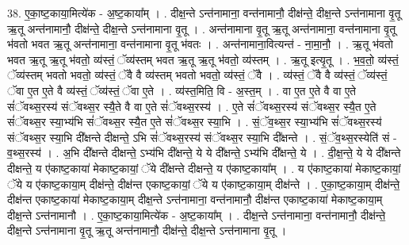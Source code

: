 \documentclass[17pt]{extarticle}
\begin{document}
38. ए॒का॒ष्ट॒काया॒मित्ये॑क - अ॒ष्ट॒काया᳚म् । . दीक्ष॒न्ते ऽन्त॑नामाना॒ वन्त॑नामानौ॒ दीक्ष॑न्ते॒ दीक्ष॒न्ते ऽन्त॑नामाना वृ॒तू ऋ॒तू अन्त॑नामानौ॒ दीक्ष॑न्ते॒ दीक्ष॒न्ते ऽन्त॑नामाना वृ॒तू । . अन्त॑नामाना वृ॒तू ऋ॒तू अन्त॑नामाना॒ वन्त॑नामाना वृ॒तू भ॑वतो भवत ऋ॒तू अन्त॑नामाना॒ वन्त॑नामाना वृ॒तू भ॑वतः । . अन्त॑नामाना॒वित्यन्त॑ - ना॒मा॒नौ॒ । . ऋ॒तू भ॑वतो भवत ऋ॒तू ऋ॒तू भ॑वतो॒ व्य॑स्तं॒ ॅव्य॑स्तम् भवत ऋ॒तू ऋ॒तू भ॑वतो॒ व्य॑स्तम् । . ऋ॒तू इत्यृ॒तू । . भ॒व॒तो॒ व्य॑स्तं॒ ॅव्य॑स्तम् भवतो भवतो॒ व्य॑स्तं॒ ॅवै वै व्य॑स्तम् भवतो भवतो॒ व्य॑स्तं॒ ॅवै । . व्य॑स्तं॒ ॅवै वै व्य॑स्तं॒ ॅव्य॑स्तं॒ ॅवा ए॒त ए॒ते वै व्य॑स्तं॒ ॅव्य॑स्तं॒ ॅवा ए॒ते । . व्य॑स्त॒मिति॒ वि - अ॒स्त॒म् । . वा ए॒त ए॒ते वै वा ए॒ते सं॑ॅवथ्स॒रस्य॑ संॅवथ्स॒र स्यै॒ते वै वा ए॒ते सं॑ॅवथ्स॒रस्य॑ । . ए॒ते सं॑ॅवथ्स॒रस्य॑ संॅवथ्स॒र स्यै॒त ए॒ते सं॑ॅवथ्स॒र स्या॒भ्य॑भि सं॑ॅवथ्स॒र स्यै॒त ए॒ते सं॑ॅवथ्स॒र स्या॒भि । . सं॒ॅव॒थ्स॒र स्या॒भ्य॑भि सं॑ॅवथ्स॒रस्य॑ संॅवथ्स॒र स्या॒भि दी᳚क्षन्ते दीक्षन्ते॒ ऽभि सं॑ॅवथ्स॒रस्य॑ संॅवथ्स॒र स्या॒भि दी᳚क्षन्ते । . सं॒ॅव॒थ्स॒रस्येति॑ सं - व॒थ्स॒रस्य॑ । . अ॒भि दी᳚क्षन्ते दीक्षन्ते॒ ऽभ्य॑भि दी᳚क्षन्ते॒ ये ये दी᳚क्षन्ते॒ ऽभ्य॑भि दी᳚क्षन्ते॒ ये । . दी॒क्ष॒न्ते॒ ये ये दी᳚क्षन्ते दीक्षन्ते॒ य ए॑काष्ट॒काया॑ मेकाष्ट॒कायां॒ ॅये दी᳚क्षन्ते दीक्षन्ते॒ य ए॑काष्ट॒काया᳚म् । . य ए॑काष्ट॒काया॑ मेकाष्ट॒कायां॒ ॅये य ए॑काष्ट॒काया॒म् दीक्ष॑न्ते॒ दीक्ष॑न्त एकाष्ट॒कायां॒ ॅये य ए॑काष्ट॒काया॒म् दीक्ष॑न्ते । . ए॒का॒ष्ट॒काया॒म् दीक्ष॑न्ते॒ दीक्ष॑न्त एकाष्ट॒काया॑ मेकाष्ट॒काया॒म् दीक्ष॒न्ते ऽन्त॑नामाना॒ वन्त॑नामानौ॒ दीक्ष॑न्त एकाष्ट॒काया॑ मेकाष्ट॒काया॒म् दीक्ष॒न्ते ऽन्त॑नामानौ । . ए॒का॒ष्ट॒काया॒मित्ये॑क - अ॒ष्ट॒काया᳚म् । . दीक्ष॒न्ते ऽन्त॑नामाना॒ वन्त॑नामानौ॒ दीक्ष॑न्ते॒ दीक्ष॒न्ते ऽन्त॑नामाना वृ॒तू ऋ॒तू अन्त॑नामानौ॒ दीक्ष॑न्ते॒ दीक्ष॒न्ते ऽन्त॑नामाना वृ॒तू । \newline
\end{document}
